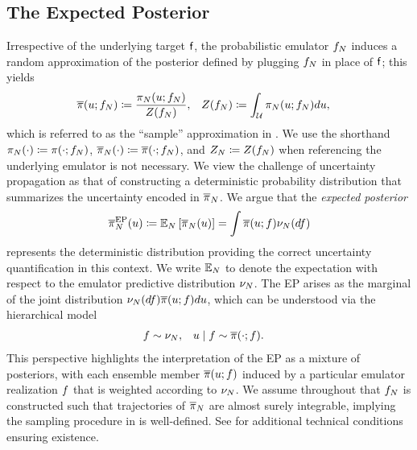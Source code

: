 \documentclass[12pt]{article}
\begin{document}
\subsection{The Expected Posterior} \label{sec:EP}
Irrespective of the underlying target $\mathsf{f}$, the probabilistic emulator $f_{N}$ 
induces a random approximation of the posterior defined by plugging $f_{N}$
in place of $\mathsf{f}$; this yields
\begin{align}
\overline{\pi}(u; f_{N}) 
&\coloneqq \frac{\pi_{N}(u; f_{N})}{Z(f_{N})},
&&Z(f_{N}) \coloneqq \int_{\mathcal{U}} \pi_{N}(u; f_{N}) du, \label{eq:random-post}
\end{align}
which is referred to as the ``sample'' approximation in \citet{StuartTeck1}. We use the 
shorthand $\pi_{N}(\cdot) \coloneqq \pi(\cdot; f_{N})$, 
$\overline{\pi}_{N}(\cdot) \coloneqq \overline{\pi}(\cdot; f_{N})$, and 
$Z_{N} \coloneqq Z(f_{N})$ when referencing the underlying 
emulator is not necessary. 
We view the challenge of uncertainty propagation as that of constructing a deterministic 
probability distribution that summarizes the uncertainty encoded in $\overline{\pi}_{N}$.
We argue that the \textit{expected posterior}
\begin{equation}
\overline{\pi}_{N}^{\mathrm{EP}}(u) \coloneqq 
\mathbb{E}_{N}\left[\overline{\pi}_{N}(u) \right]
= \int \overline{\pi}(u; f) \nu_{N}(df) \label{eq:ep-approx}
\end{equation}
represents the deterministic distribution providing the correct uncertainty quantification 
in this context. We write $\mathbb{E}_{N}$ to denote the expectation with respect to the 
emulator predictive distribution $\nu_{N}$. 
The EP arises as the marginal of the 
joint distribution $\nu_{N}(df) \overline{\pi}(u; f) du$, which 
can be understood via the hierarchical model 
\begin{align}
&f  \sim \nu_{N}, 
&&u \mid f \sim \overline{\pi}(\cdot; f).
\label{eq:ep-prob-model}
\end{align}
This perspective highlights the interpretation of the EP as a mixture of posteriors,
with each ensemble member $\overline{\pi}(u; f)$ induced by 
a particular emulator realization $f$ that is weighted according to $\nu_{N}$.
We assume throughout that $f_{N}$ is 
constructed such that 
trajectories of $\overline{\pi}_{N}$ are almost surely integrable, implying the sampling procedure
in  is well-defined. See 
\citet{StuartTeck1,StuartTeck2,random_fwd_models,garegnani2021NoisyMCMC} for additional
technical conditions ensuring existence. 
\end{document}

